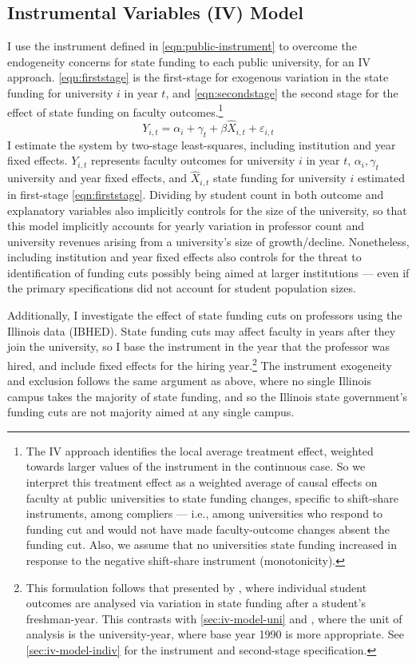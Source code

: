 \subsection{Instrumental Variables (IV) Model}
\label{sec:iv-model-uni}
I use the instrument defined in \autoref{eqn:public-instrument} to overcome the endogeneity concerns for state funding to each public university, for an IV approach.
\autoref{eqn:firststage} is the first-stage for exogenous variation in the state funding for university $i$ in year $t$, and \autoref{eqn:secondstage} the second stage for the effect of state funding on faculty outcomes.\footnote{
    The IV approach identifies the local average treatment effect, weighted towards larger values of the instrument in the continuous case.
    So we interpret this treatment effect as a weighted average of causal effects on faculty at public universities to state funding changes, specific to shift-share instruments, among compliers --- i.e., among universities who respond to funding cut and would not have made faculty-outcome changes absent the funding cut.
    Also, we assume that no universities state funding increased in response to the negative shift-share instrument (monotonicity).
}
\begin{equation}
    \label{eqn:secondstage}
    Y_{i,t} = \alpha_i + \gamma_t + \beta \widehat X_{i,t} + \varepsilon_{i,t}
\end{equation}
I estimate the system by two-stage least-squares, including institution and year fixed effects.
$Y_{i,t}$ represents faculty outcomes for university $i$ in year $t$, $\alpha_i, \gamma_t$ university and year fixed effects, and $\widehat X_{i,t}$ state funding for university $i$ estimated in first-stage \eqref{eqn:firststage}.
Dividing by student count in both outcome and explanatory variables also implicitly controls for the size of the university, so that this model implicitly accounts for yearly variation in professor count and university revenues arising from a university's size of growth/decline.
Nonetheless, including institution and year fixed effects also controls for the threat to identification of funding cuts possibly being aimed at larger institutions --- even if the primary specifications did not account for student population sizes.

Additionally, I investigate the effect of state funding cuts on professors using the Illinois data (IBHED).
State funding cuts may affect faculty in years after they join the university, so I base the instrument in the year that the professor was hired, and include fixed effects for the hiring year.\footnote{
    This formulation follows that presented by \cite{NBERw27885}, where individual student outcomes are analysed via variation in state funding after a student's freshman-year.
    This contrasts with \autoref{sec:iv-model-uni} and \cite{NBERw23736}, where the unit of analysis is the university-year, where base year 1990 is more appropriate.
    See \autoref{sec:iv-model-indiv} for the instrument and second-stage specification.
}
The instrument exogeneity and exclusion follows the same argument as above, where no single Illinois campus takes the majority of state funding, and so
the Illinois state government's funding cuts are not majority aimed at any single campus.

